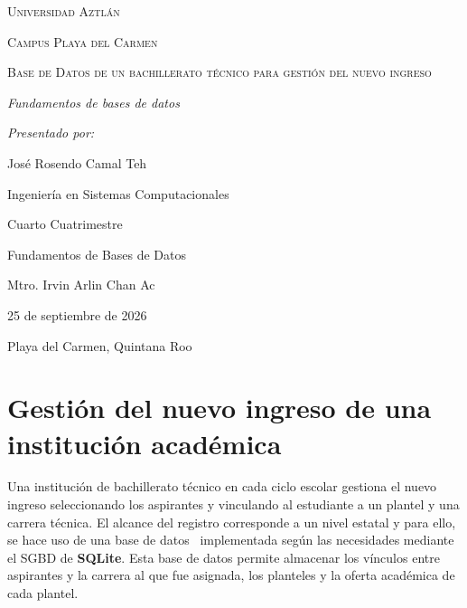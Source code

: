 \documentclass[12pt]{article}
\begin{document}
\begin{titlepage}
	\centering
	{\scshape\LARGE Universidad Aztlán \par}
	\vspace{1cm}
	{\scshape\Large Campus Playa del Carmen \par}
	\vspace{1.75cm}
	{\scshape\Huge Base de Datos de un bachillerato técnico para gestión del nuevo ingreso \par}
    \vfill
    {\itshape\Large Fundamentos de bases de datos \par}
	\vspace{2cm}
    {\itshape\Large Presentado por: \par}
	{\Large José Rosendo Camal Teh \par}
	\vfill
	{\Large Ingeniería en Sistemas Computacionales \par}
	{\Large Cuarto Cuatrimestre \par}
	{\Large Fundamentos de Bases de Datos \par}
	\vfill
	{\Large Mtro. Irvin Arlin Chan Ac \par}
	\vfill
	{\Large 25 de septiembre de 2026 \par}
	\vfill
	{\Large Playa del Carmen, Quintana Roo \par}
\end{titlepage}
\newpage

\tableofcontents
\newpage



\section*{\centering Gestión del nuevo ingreso de una institución académica}

Una institución de bachillerato técnico en cada ciclo escolar gestiona el nuevo ingreso seleccionando los aspirantes y vinculando al estudiante a un plantel y una carrera técnica. El alcance del registro corresponde a un nivel estatal y para ello, se hace uso de una base de datos~\cite{rosendocamal} implementada según las necesidades mediante el SGBD de \textbf{SQLite}. Esta base de datos permite almacenar los vínculos entre aspirantes y la carrera al que fue asignada, los planteles y la oferta académica de cada plantel.
\end{document}
